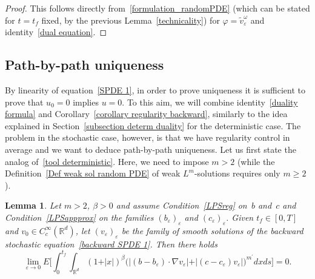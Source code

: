 \documentclass[a4paper,10pt]{article}
\newtheorem{lemma}[theorem]{Lemma}
\newcommand\1{\mathbbm{1}}
\newcommand{\eps}{\varepsilon}
\numberwithin{equation}{section}
\begin{document}
\begin{proof}
This follows directly from~\eqref{formulation_randomPDE} (which can be stated for $t=t_f$ fixed, by the previous Lemma~\ref{technicality}) for $\varphi = \widetilde{v}_{\eps}^\omega$ and identity~\eqref{dual equation}.
\end{proof}

\subsection{Path-by-path uniqueness\label{subsection path by path uniq}}

By linearity of equation~\eqref{SPDE 1}, in order to prove uniqueness it is sufficient to prove that $u_{0}=0$ implies $u=0$. To this aim, we will combine identity~\eqref{duality formula} and Corollary~\ref{corollary regularity backward}, similarly to the idea explained in Section~\ref{subsection determ duality} for the deterministic case. The problem in the stochastic case, however, is that we have regularity control in average and we want to deduce path-by-path uniqueness. Let us first state the analog of~\eqref{tool deterministic}. Here, we need to impose $m>2$ (while the Definition~\ref{Def weak sol random PDE} of weak $L^m$-solutions requires only $m\geq2$). 

\begin{lemma}
\label{lemma tool stoch} 
Let $m>2$, $\beta>0$ and assume Condition~\ref{LPSreg} on~$b$ and~$c$ and Condition~\ref{LPSappprox} on the families $(b_\eps)_\eps$ and $(c_\eps)_\eps$. Given $t_{f}\in [0,T]$ and $v_{0}\in C_{c}^{\infty}(\mathbb{R}^{d})$, let $(v_{\eps})_\eps$ be the family of smooth solutions of the backward stochastic equation~\eqref{backward SPDE 1}. Then there holds
\begin{equation*}
\lim_{\eps\rightarrow0} E \bigg[ \int_{0}^{t_{f}}\int_{\mathbb{R}^{d}}(
1+\vert x \vert )^{\beta} \big( \vert (  b-b_{\eps})  \cdot\nabla v_{\eps} \vert + \vert (c-c_{\eps})  v_{\eps} \vert \big)^{m^{\prime}}dxds \bigg] =0 .
\end{equation*}
\end{lemma}
\end{document}
